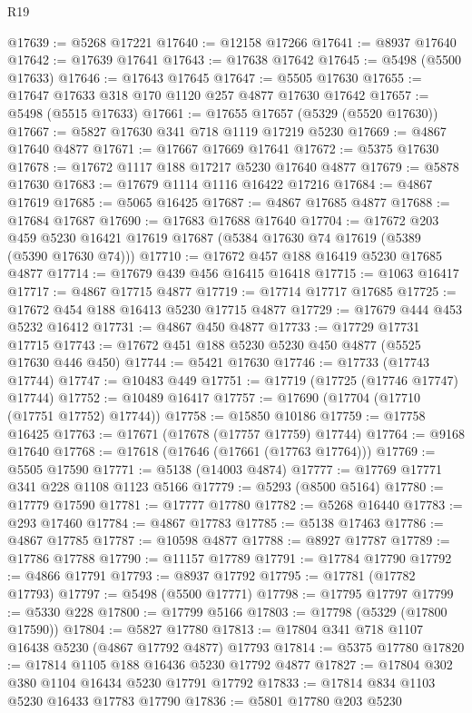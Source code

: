 \begin{lexlean}{R19}
\begin{coremodule}
@17639 := @5268 @17221
@17640 := @12158 @17266
@17641 := @8937 @17640
@17642 := @17639 @17641
@17643 := @17638 @17642
@17645 := @5498 (@5500 @17633)
@17646 := @17643 @17645
@17647 := @5505 @17630
@17655 := @17647 @17633 @318 @170 @1120 @257 @4877 @17630 @17642
@17657 := @5498 (@5515 @17633)
@17661 := @17655 @17657 (@5329 (@5520 @17630))
@17667 := @5827 @17630 @341 @718 @1119 @17219 @5230
@17669 := @4867 @17640 @4877
@17671 := @17667 @17669 @17641
@17672 := @5375 @17630
@17678 := @17672 @1117 @188 @17217 @5230 @17640 @4877
@17679 := @5878 @17630
@17683 := @17679 @1114 @1116 @16422 @17216
@17684 := @4867 @17619
@17685 := @5065 @16425
@17687 := @4867 @17685 @4877
@17688 := @17684 @17687
@17690 := @17683 @17688 @17640
@17704 := @17672
    @203
    @459
    @5230
    @16421
    @17619
    @17687
    (@5384 @17630 @74 @17619 (@5389 (@5390 @17630 @74)))
@17710 := @17672 @457 @188 @16419 @5230 @17685 @4877
@17714 := @17679 @439 @456 @16415 @16418
@17715 := @1063 @16417
@17717 := @4867 @17715 @4877
@17719 := @17714 @17717 @17685
@17725 := @17672 @454 @188 @16413 @5230 @17715 @4877
@17729 := @17679 @444 @453 @5232 @16412
@17731 := @4867 @450 @4877
@17733 := @17729 @17731 @17715
@17743 := @17672 @451 @188 @5230 @5230 @450 @4877 (@5525 @17630 @446 @450)
@17744 := @5421 @17630
@17746 := @17733 (@17743 @17744)
@17747 := @10483 @449
@17751 := @17719 (@17725 (@17746 @17747) @17744)
@17752 := @10489 @16417
@17757 := @17690 (@17704 (@17710 (@17751 @17752) @17744))
@17758 := @15850 @10186
@17759 := @17758 @16425
@17763 := @17671 (@17678 (@17757 @17759) @17744)
@17764 := @9168 @17640
@17768 := @17618 (@17646 (@17661 (@17763 @17764)))
@17769 := @5505 @17590
@17771 := @5138 (@14003 @4874)
@17777 := @17769 @17771 @341 @228 @1108 @1123 @5166
@17779 := @5293 (@8500 @5164)
@17780 := @17779 @17590
@17781 := @17777 @17780
@17782 := @5268 @16440
@17783 := @293 @17460
@17784 := @4867 @17783
@17785 := @5138 @17463
@17786 := @4867 @17785
@17787 := @10598 @4877
@17788 := @8927 @17787
@17789 := @17786 @17788
@17790 := @11157 @17789
@17791 := @17784 @17790
@17792 := @4866 @17791
@17793 := @8937 @17792
@17795 := @17781 (@17782 @17793)
@17797 := @5498 (@5500 @17771)
@17798 := @17795 @17797
@17799 := @5330 @228
@17800 := @17799 @5166
@17803 := @17798 (@5329 (@17800 @17590))
@17804 := @5827 @17780
@17813 := @17804 @341 @718 @1107 @16438 @5230 (@4867 @17792 @4877) @17793
@17814 := @5375 @17780
@17820 := @17814 @1105 @188 @16436 @5230 @17792 @4877
@17827 := @17804 @302 @380 @1104 @16434 @5230 @17791 @17792
@17833 := @17814 @834 @1103 @5230 @16433 @17783 @17790
@17836 := @5801 @17780 @203 @5230

\end{coremodule}
\end{lexlean}
